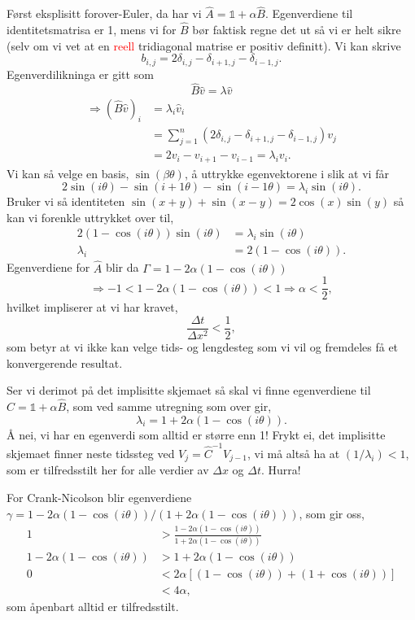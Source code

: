 \documentclass[norsk, 10pt]{article}
\newcommand{\red}[1]{\textcolor{red}{#1}}
\begin{document}
Først eksplisitt forover-Euler, da har vi $\hat A = \mathbb 1 + \alpha \hat B$. Egenverdiene til identitetsmatrisa er 1, mens vi for $\hat B$ bør faktisk regne det ut så vi er helt sikre (selv om vi vet at en \red{reell} tridiagonal matrise er positiv definitt). Vi kan skrive
$$ b_{i,j} = 2\delta_{i,j} - \delta_{i+1,j} - \delta_{i-1,j}. $$
Egenverdilikninga er gitt som
$$ \hat B \hat v = \lambda \hat v $$
\begin{align*}
	\Rightarrow (\hat B \hat v)_i &= \lambda_i \hat v_i \\
	&= \sum\limits_{j=1}^{n}(2\delta_{i,j} - \delta_{i+1,j} - \delta_{i-1,j})v_j \\
	&= 2v_{i} - v_{i+1} - v_{i-1} = \lambda_i v_i.
\end{align*}
Vi kan så velge en basis, $\sin(\beta\theta)$, å uttrykke egenvektorene i slik at vi får
$$ 2\sin(i\theta) - \sin(i+1\theta) - \sin(i-1\theta) = \lambda_i \sin(i\theta). $$
Bruker vi så identiteten $\sin(x+y) + \sin(x-y) = 2\cos(x)\sin(y)$ så kan vi forenkle uttrykket over til,
\begin{align*}
2(1 - \cos(i\theta) )\sin(i\theta) &= \lambda_i \sin(i\theta) \\
\lambda_i &= 2(1 - \cos(i\theta) ).
\end{align*}
Egenverdiene for $\hat A$ blir da $\Gamma = 1-2\alpha(1 - \cos(i\theta) )$
$$ \Rightarrow -1 < 1-2\alpha(1 - \cos(i\theta) ) < 1 \Rightarrow \alpha < \frac{1}{2}, $$
hvilket impliserer at vi har kravet,
$$ \frac{\Delta t}{\Delta x^2} < \frac{1}{2}, $$
som betyr at vi ikke kan velge tids- og lengdesteg som vi vil og fremdeles få et konvergerende resultat.

Ser vi derimot på det implisitte skjemaet så skal vi finne egenverdiene til $\hat C = \mathbb 1 + \alpha \hat B$, som ved samme utregning som over gir,
$$ \lambda_i = 1 + 2\alpha(1-\cos(i\theta)). $$
Å nei, vi har en egenverdi som alltid er større enn 1! Frykt ei, det implisitte skjemaet finner neste tidssteg ved $ V_j = \hat C^{-1} V_{j-1}$, vi må altså ha at $(1/\lambda_i) < 1$, som er tilfredsstilt her for alle verdier av $\Delta x$ og $\Delta t$. Hurra!

For Crank-Nicolson blir egenverdiene $\gamma = 1-2\alpha(1 - \cos(i\theta) ) / (1 + 2\alpha(1-\cos(i\theta)))$, som gir oss,
\begin{align*}
	1 &> \frac{1-2\alpha(1 - \cos(i\theta) )}{1 + 2\alpha(1-\cos(i\theta))} \\
	1-2\alpha(1 - \cos(i\theta) ) &> 1 + 2\alpha(1-\cos(i\theta)) \\
	0 &< 2\alpha[(1-\cos(i\theta)) + (1+\cos(i\theta))] \\
	&< 4\alpha,
\end{align*}
som åpenbart alltid er tilfredsstilt.
\end{document}
